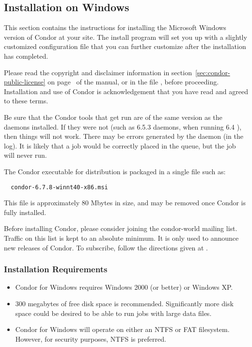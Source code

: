 \subsection{\label{sec:Windows-Install}Installation on Windows}

This section contains the instructions for installing the Microsoft
Windows version of Condor at your site.  
The install program will set you up with a slightly customized configuration
file that you can further customize after the installation has completed.

Please read the copyright and disclaimer information in 
section~\ref{sec:condor-public-license} on
page~\pageref{sec:condor-public-license} of the manual, or in the
file 
, before proceeding.  Installation and
use of Condor is acknowledgement that you have read and agreed to these
terms.

Be sure that the Condor tools that get run are of the same version
as the daemons installed.
If they were not (such as 6.5.3 daemons, when running 6.4 ),
then things will not work.
There may be errors generated by the  daemon (in the log).
It is likely that a job would be correctly placed in the queue,
but the job will never run.

The Condor executable for distribution is packaged in
a single file such as:
\begin{verbatim}
  condor-6.7.8-winnt40-x86.msi
\end{verbatim}

This file is approximately 80 Mbytes in size, and may be
removed once Condor is fully installed.

Before installing Condor, please consider joining the condor-world mailing
list.  Traffic on this list is kept to an absolute minimum.  It is only
used to announce new releases of Condor.
To subscribe, follow the directions given at
.

\subsubsection{Installation Requirements}

\begin{itemize}

\item Condor for Windows requires Windows 2000 (or better) or Windows XP.

\item 300 megabytes of free disk space is recommended.  Significantly more 
disk space could be desired to be able to run jobs with large data files.

\item Condor for Windows will operate on either an NTFS or FAT filesystem.  However, for security purposes, NTFS is preferred.

\end{itemize}

